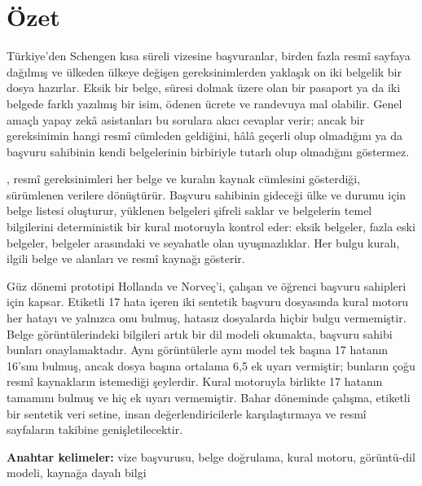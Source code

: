 \chapter*{Özet}
Türkiye'den Schengen kısa süreli vizesine başvuranlar, birden fazla resmî sayfaya dağılmış ve
ülkeden ülkeye değişen gereksinimlerden yaklaşık on iki belgelik bir dosya hazırlar. Eksik bir
belge, süresi dolmak üzere olan bir pasaport ya da iki belgede farklı yazılmış bir isim, ödenen
ücrete ve randevuya mal olabilir. Genel amaçlı yapay zekâ asistanları bu sorulara akıcı cevaplar
verir; ancak bir gereksinimin hangi resmî cümleden geldiğini, hâlâ geçerli olup olmadığını ya da
başvuru sahibinin kendi belgelerinin birbiriyle tutarlı olup olmadığını göstermez.

\project{}, resmî gereksinimleri her belge ve kuralın kaynak cümlesini gösterdiği, sürümlenen
verilere dönüştürür. Başvuru sahibinin gideceği ülke ve durumu için belge listesi oluşturur,
yüklenen belgeleri şifreli saklar ve belgelerin temel bilgilerini deterministik bir kural motoruyla
kontrol eder: eksik belgeler, fazla eski belgeler, belgeler arasındaki ve seyahatle olan
uyuşmazlıklar. Her bulgu kuralı, ilgili belge ve alanları ve resmî kaynağı gösterir.

Güz dönemi prototipi Hollanda ve Norveç'i, çalışan ve öğrenci başvuru sahipleri için kapsar.
Etiketli 17 hata içeren iki sentetik başvuru dosyasında kural motoru her hatayı ve yalnızca onu
bulmuş, hatasız dosyalarda hiçbir bulgu vermemiştir. Belge görüntülerindeki bilgileri artık bir dil
modeli okumakta, başvuru sahibi bunları onaylamaktadır. Aynı görüntülerle aynı model tek başına 17
hatanın 16'sını bulmuş, ancak dosya başına ortalama 6,5 ek uyarı vermiştir; bunların çoğu resmî
kaynakların istemediği şeylerdir. Kural motoruyla birlikte 17 hatanın tamamını bulmuş ve hiç ek
uyarı vermemiştir.
Bahar döneminde çalışma, etiketli bir sentetik veri setine, insan değerlendiricilerle
karşılaştırmaya ve resmî sayfaların takibine genişletilecektir.

\noindent\textbf{Anahtar kelimeler:} vize başvurusu, belge doğrulama, kural motoru,
görüntü-dil modeli, kaynağa dayalı bilgi
